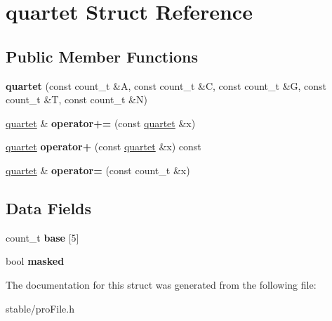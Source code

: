 \hypertarget{structquartet}{\section{quartet Struct Reference}
\label{structquartet}
}
\subsection*{Public Member Functions}
\begin{DoxyCompactItemize}
\item 
\hypertarget{structquartet_a4e62827f68d59ffaa81ec61ddc979596}{{\bfseries quartet} (const count\-\_\-t \&A, const count\-\_\-t \&C, const count\-\_\-t \&G, const count\-\_\-t \&T, const count\-\_\-t \&N)}\label{structquartet_a4e62827f68d59ffaa81ec61ddc979596}

\item 
\hypertarget{structquartet_a6b1bb41bb1851aadb3647afa62bb34ed}{\hyperlink{structquartet}{quartet} \& {\bfseries operator+=} (const \hyperlink{structquartet}{quartet} \&x)}\label{structquartet_a6b1bb41bb1851aadb3647afa62bb34ed}

\item 
\hypertarget{structquartet_af45359481a51a08241411e9aafdbccc5}{\hyperlink{structquartet}{quartet} {\bfseries operator+} (const \hyperlink{structquartet}{quartet} \&x) const }\label{structquartet_af45359481a51a08241411e9aafdbccc5}

\item 
\hypertarget{structquartet_a028bb3904f94f555cb6349b227da6798}{\hyperlink{structquartet}{quartet} \& {\bfseries operator=} (const count\-\_\-t \&x)}\label{structquartet_a028bb3904f94f555cb6349b227da6798}

\end{DoxyCompactItemize}
\subsection*{Data Fields}
\begin{DoxyCompactItemize}
\item 
\hypertarget{structquartet_ab6231b6ff3dbe82a46c6411c9a56f12e}{count\-\_\-t {\bfseries base} \mbox{[}5\mbox{]}}\label{structquartet_ab6231b6ff3dbe82a46c6411c9a56f12e}

\item 
\hypertarget{structquartet_ab55b5c0ef78a0dabebdc7bec6a1bd053}{bool {\bfseries masked}}\label{structquartet_ab55b5c0ef78a0dabebdc7bec6a1bd053}

\end{DoxyCompactItemize}


The documentation for this struct was generated from the following file\-:\begin{DoxyCompactItemize}
\item 
stable/pro\-File.\-h\end{DoxyCompactItemize}
